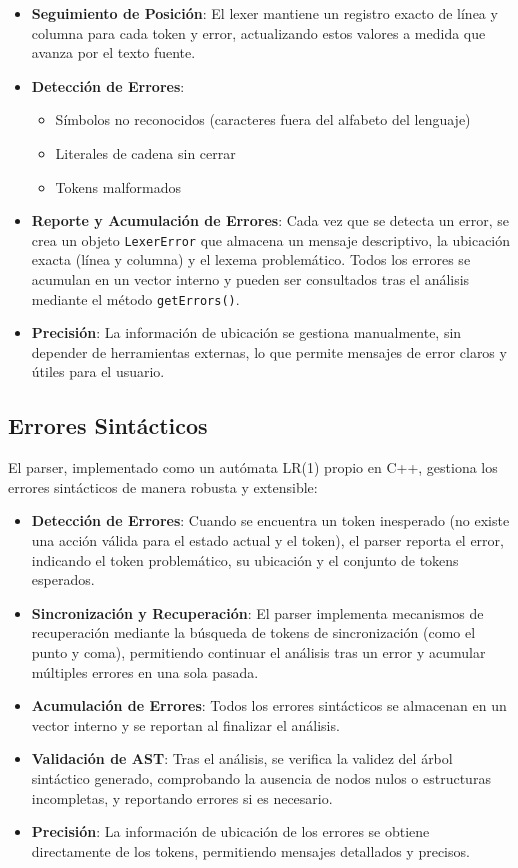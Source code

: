 \documentclass[11pt, a4paper, twoside]{article} %
\begin{document}
\begin{itemize}
    \item \textbf{Seguimiento de Posición}: El lexer mantiene un registro exacto de línea y columna para cada token y error, actualizando estos valores a medida que avanza por el texto fuente.
    \item \textbf{Detección de Errores}:
    \begin{itemize}
        \item Símbolos no reconocidos (caracteres fuera del alfabeto del lenguaje)
        \item Literales de cadena sin cerrar
        \item Tokens malformados
    \end{itemize}
    \item \textbf{Reporte y Acumulación de Errores}: Cada vez que se detecta un error, se crea un objeto \texttt{LexerError} que almacena un mensaje descriptivo, la ubicación exacta (línea y columna) y el lexema problemático. Todos los errores se acumulan en un vector interno y pueden ser consultados tras el análisis mediante el método \texttt{getErrors()}.
    \item \textbf{Precisión}: La información de ubicación se gestiona manualmente, sin depender de herramientas externas, lo que permite mensajes de error claros y útiles para el usuario.
\end{itemize}

\subsection{Errores Sintácticos}

El parser, implementado como un autómata LR(1) propio en C++, gestiona los errores sintácticos de manera robusta y extensible:

\begin{itemize}
    \item \textbf{Detección de Errores}: Cuando se encuentra un token inesperado (no existe una acción válida para el estado actual y el token), el parser reporta el error, indicando el token problemático, su ubicación y el conjunto de tokens esperados.
    \item \textbf{Sincronización y Recuperación}: El parser implementa mecanismos de recuperación mediante la búsqueda de tokens de sincronización (como el punto y coma), permitiendo continuar el análisis tras un error y acumular múltiples errores en una sola pasada.
    \item \textbf{Acumulación de Errores}: Todos los errores sintácticos se almacenan en un vector interno y se reportan al finalizar el análisis.
    \item \textbf{Validación de AST}: Tras el análisis, se verifica la validez del árbol sintáctico generado, comprobando la ausencia de nodos nulos o estructuras incompletas, y reportando errores si es necesario.
    \item \textbf{Precisión}: La información de ubicación de los errores se obtiene directamente de los tokens, permitiendo mensajes detallados y precisos.
\end{itemize}
\end{document}
